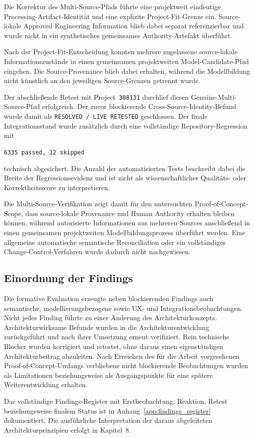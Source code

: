 Die Korrektur des Multi-Source-Pfads führte eine projektweit eindeutige
Processing-Artifact-Identität und eine explizite Project-Fit-Grenze ein.
Source-lokale Approved Engineering Information blieb dabei separat
referenzierbar und wurde nicht in ein synthetisches gemeinsames
Authority-Artefakt überführt.

Nach der Project-Fit-Entscheidung konnten mehrere zugelassene
source-lokale Informationszustände in einen gemeinsamen projektweiten
Model-Candidate-Pfad eingehen. Die Source-Provenance blieb dabei erhalten,
während die Modellbildung nicht künstlich an den jeweiligen Source-Grenzen
getrennt wurde.

Der abschließende Retest mit Project~\texttt{308131} durchlief diesen
Genuine-Multi-Source-Pfad erfolgreich. Der zuvor blockierende
Cross-Source-Identity-Befund wurde damit als
\texttt{RESOLVED / LIVE RETESTED} geschlossen. Der finale
Integrationsstand wurde zusätzlich durch eine vollständige
Repository-Regression mit

\begin{center}
\texttt{6335 passed, 12 skipped}
\end{center}

technisch abgesichert. Die Anzahl der automatisierten Tests beschreibt dabei
die Breite der Regressionsevidenz und ist nicht als wissenschaftlicher
Qualitäts- oder Korrektheitsscore zu interpretieren.

Die Multi-Source-Verifikation zeigt damit für den untersuchten
Proof-of-Concept-Scope, dass source-lokale Provenance und Human Authority
erhalten bleiben können, während autorisierte Informationen aus mehreren
Sources anschließend in einen gemeinsamen projektweiten Modellbildungsprozess
überführt werden. Eine allgemeine automatische semantische Reconciliation
oder ein vollständiges Change-Control-Verfahren wurde dadurch nicht
nachgewiesen.

\subsection{Einordnung der Findings}

Die formative Evaluation erzeugte neben blockierenden Findings auch
semantische, modellierungsbezogene sowie UX- und
Integrationsbeobachtungen. Nicht jedes Finding führte zu einer Änderung des
Architekturkonzepts. Architekturwirksame Befunde wurden in die
Architekturentwicklung zurückgeführt und nach ihrer Umsetzung erneut
verifiziert. Rein technische Blocker wurden korrigiert und retestet, ohne
daraus einen eigenständigen Architekturbeitrag abzuleiten. Nach Erreichen des
für die Arbeit vorgesehenen Proof-of-Concept-Umfangs verbliebene
nicht blockierende Beobachtungen wurden als Limitationen beziehungsweise als
Ausgangspunkte für eine spätere Weiterentwicklung erhalten.

Das vollständige Findings-Register mit Erstbeobachtung, Reaktion,
Retest beziehungsweise finalem Status ist in
Anhang~\ref{app:findings_register} dokumentiert. Die ausführliche
Interpretation der daraus abgeleiteten Architekturprinzipien erfolgt in
Kapitel~8.